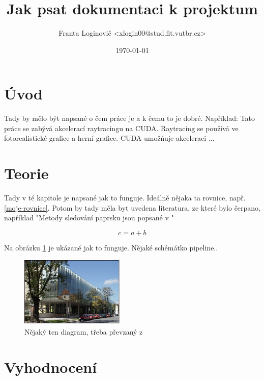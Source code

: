 \documentclass[12pt]{article}
\title{Jak psat dokumentaci k projektum}
\author{Franta Loginovič <xlogin00@stud.fit.vutbr.cz>}
\date{\today}
\begin{document}
\maketitle

\section{Úvod}

Tady by mělo být napsané o čem práce je a k čemu to je dobré. Například: Tato práce se zabývá akcelerací
raytracingu na CUDA. Raytracing se používá ve fotorealistické grafice a herní grafice. CUDA umožňuje
akceleraci ...


\section{Teorie}

Tady v té kapitole je napsané jak to funguje. Ideálně nějaka ta rovnice, např. \ref{moje-rovnice}. Potom by
tady měla byt uvedena literatura, ze které bylo čerpano, například "Metody sledování paprsku jsou popsané v \cite{Cox2008} \cite{zemcik2006}"


\begin{equation}
  \label{moje-rovnice}
  c = a + b
\end{equation}

Na obrázku \ref{fig:obrazek} je ukázané jak to funguje. Nějaké schémátko pipeline..

\begin{figure}[htb]
  \centering
  \includegraphics[width=5cm,keepaspectratio]{obrazek.jpg}
  \caption{Nějaký ten diagram, třeba převzaný z \cite{wikipedia}}
  \label{fig:obrazek}
\end{figure}



\section{Vyhodnocení}
\end{document}
